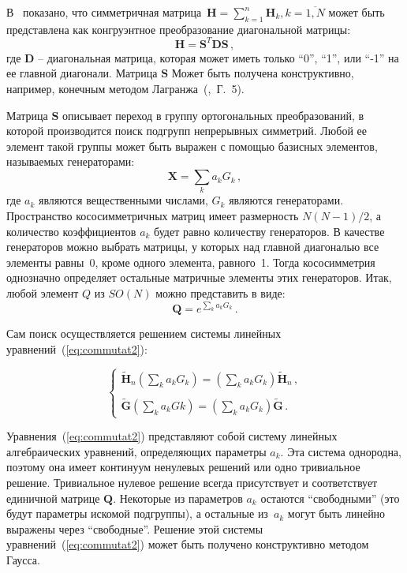 \documentclass{llncs}
\begin{document}
В~\cite{yurkov:symmetry} показано, что симметричная матрица~$\textbf{H} = \sum_{k=1}^{n}\textbf{H}_k, k = \overline{1,N}$ может быть представлена как конгруэнтное преобразование диагональной матрицы:
%
\begin{equation}
\label{eq:BSSTDS}
\textbf{H}=\textbf{S}^T\textbf{DS} \, ,
\end{equation}
%
где $\textbf{D}$ -- диагональная матрица, которая может иметь только ``0'', ``1'', или ``-1'' на ее главной диагонали. Матрица $\textbf{S}$ Может быть получена конструктивно, например, конечным методом Лагранжа~(\cite{Lancaster},~Г.~5).

Матрица $\textbf{S}$ описывает переход в группу ортогональных преобразований, в которой производится поиск подгрупп непрерывных симметрий.
Любой ее элемент такой группы может быть выражен с помощью базисных элементов, называемых генераторами:
%
\begin{equation}
\textbf{X} = \sum_k a_k G_k \, ,
\end{equation}
%
где $ a_k $ являются вещественными числами, $G_k $ являются генераторами. Пространство кососимметричных матриц имеет размерность $N(N-1)/2$, а количество коэффициентов $a_k$ будет равно количеству генераторов. В качестве генераторов можно выбрать матрицы, у которых над главной диагональю все элементы равны~0, кроме одного элемента, равного~1. Тогда кососимметрия однозначно определяет остальные матричные элементы этих генераторов. Итак, любой элемент $Q$ из $SO(N)$ можно представить в виде:
%
\begin{equation}
\label{eq:sunexp}
\textbf{Q}=e^{\sum_k a_k G_k} \, .
\end{equation}
%

Сам поиск осуществляется решением системы линейных уравнений~(\ref{eq:commutat2}):

%
\begin{equation}
\label{eq:commutat2}
\left\{
\begin{array}{l}
\displaystyle
\tilde{\textbf{H}}_n \left(\sum\limits_ka_kG_k\right) =
\left(\sum\limits_ka_kG_k\right) \tilde{\textbf{H}}_n \, , \\ \\
\displaystyle
\tilde{\textbf{G}} \left(\sum\limits_ka_kGk\right) = \left(\sum\limits_ka_kG_k\right) \tilde{\textbf{G}} \, .
\end{array}
\right.
\end{equation}
%

Уравнения~(\ref{eq:commutat2}) представляют собой систему линейных алгебраических уравнений, определяющих параметры $a_k$. Эта система однородна, поэтому она имеет континуум ненулевых решений или одно тривиальное решение. Тривиальное нулевое решение всегда присутствует и соответствует единичной матрице $\textbf{Q}$. Некоторые из параметров $a_k$ остаются ``свободными'' (это будут параметры искомой подгруппы), а остальные из~$a_k$ могут быть линейно выражены через ``свободные''. Решение этой системы уравнений~(\ref{eq:commutat2}) может быть получено конструктивно методом Гаусса.
\end{document}
